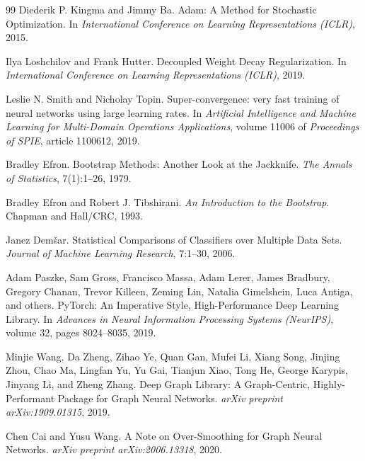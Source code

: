 \documentclass[a4paper,11pt]{article}
\begin{document}
\begin{thebibliography}{99}
Diederik P. Kingma and Jimmy Ba.
\newblock Adam: A Method for Stochastic Optimization.
\newblock In \emph{International Conference on Learning Representations (ICLR)}, 2015.

Ilya Loshchilov and Frank Hutter.
\newblock Decoupled Weight Decay Regularization.
\newblock In \emph{International Conference on Learning Representations (ICLR)}, 2019.

Leslie N. Smith and Nicholay Topin.
\newblock Super-convergence: very fast training of neural networks using large learning rates.
\newblock In \emph{Artificial Intelligence and Machine Learning for Multi-Domain Operations Applications}, volume 11006 of \emph{Proceedings of SPIE}, article 1100612, 2019.

Bradley Efron.
\newblock Bootstrap Methods: Another Look at the Jackknife.
\newblock \emph{The Annals of Statistics}, 7(1):1--26, 1979.

Bradley Efron and Robert J. Tibshirani.
\newblock \emph{An Introduction to the Bootstrap}.
\newblock Chapman and Hall/CRC, 1993.

Janez Dem\v{s}ar.
\newblock Statistical Comparisons of Classifiers over Multiple Data Sets.
\newblock \emph{Journal of Machine Learning Research}, 7:1--30, 2006.

Adam Paszke, Sam Gross, Francisco Massa, Adam Lerer, James Bradbury, Gregory Chanan, Trevor Killeen, Zeming Lin, Natalia Gimelshein, Luca Antiga, and others.
\newblock PyTorch: An Imperative Style, High-Performance Deep Learning Library.
\newblock In \emph{Advances in Neural Information Processing Systems (NeurIPS)}, volume 32, pages 8024--8035, 2019.

Minjie Wang, Da Zheng, Zihao Ye, Quan Gan, Mufei Li, Xiang Song, Jinjing Zhou, Chao Ma, Lingfan Yu, Yu Gai, Tianjun Xiao, Tong He, George Karypis, Jinyang Li, and Zheng Zhang.
\newblock Deep Graph Library: A Graph-Centric, Highly-Performant Package for Graph Neural Networks.
\newblock \emph{arXiv preprint arXiv:1909.01315}, 2019.

Chen Cai and Yusu Wang.
\newblock A Note on Over-Smoothing for Graph Neural Networks.
\newblock \emph{arXiv preprint arXiv:2006.13318}, 2020.

\end{thebibliography}
\end{document}

